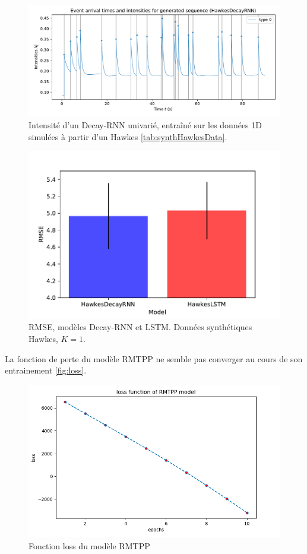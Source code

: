 \documentclass[../main.tex]{subfiles}
\begin{document}
\begin{figure}[ht]
	\includegraphics[width=\linewidth]{../results/intensity_HawkesDecayRNN_1d_hidden64_20181206-234848.pdf}
	\caption{Intensité d'un Decay-RNN univarié, entraîné sur les données 1D simulées à partir d'un Hawkes \autoref{tab:synthHawkesData}.}\label{fig:1DRNNintensityPlot}
\end{figure}

\begin{figure}
	\centering
	\includegraphics[width=0.6\linewidth]{../results/1D_Hawkes_Data_RMSE.pdf}
	\caption{RMSE, modèles Decay-RNN et LSTM. Données synthétiques Hawkes, $K=1$.}\label{fig:rmse1DhawkesData}
\end{figure}

La fonction de perte du modèle RMTPP ne semble pas converger au cours de son entrainement \autoref{fig:loss}.
\begin{figure}
	\centering
	\includegraphics[width=\linewidth]{../results/loss_funct}
	\caption{Fonction loss du modèle RMTPP}\label{fig:loss}
\end{figure}
\end{document}
